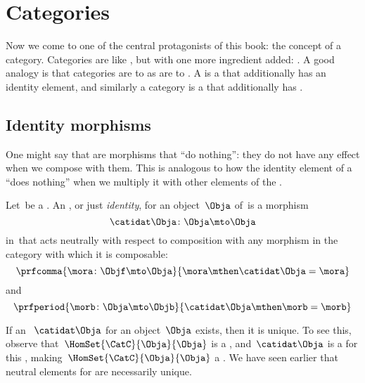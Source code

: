 \section{Categories}

Now we come to one of the central protagonists of this book: the concept of a category.
Categories are like , but with one more ingredient added: .
A good analogy is that categories are to  as  are to .
A  is a  that additionally has an identity element, and similarly a category is a  that additionally has .

\subsection{Identity morphisms}

One might say that   are morphisms that ``do nothing'': they do not have any effect when we compose with them.
This is analogous to how the identity element of a  ``does nothing'' when we multiply it with other elements of the .

\begin{ctdefinition}
    \label{def:identity-morphism}
    Let~\CatC be a .
    An , or just \emph{identity}, for an object~$\Obja$ of~\CatC is a morphism
    \begin{equation}
        \catidat\Obja \colon \Obja \mto \Obja
    \end{equation}
    in~\CatC that acts neutrally with respect to composition with any morphism in the category with which it is composable:
    \begin{equation}\label{eq:identities-unitality-1}
        \prfcomma{
            \mora \colon \Objf \mto \Obja
        }{
            \mora \mthen \catidat\Obja = \mora
        }
    \end{equation}
    and
    \begin{equation}\label{eq:identities-unitality-2}
        \prfperiod{
            \morb \colon \Obja \mto \Objb
        }{
            \catidat\Obja \mthen \morb = \morb
        }
    \end{equation}
\end{ctdefinition}

\begin{remark}
    If an ~$\catidat\Obja$ for an object~$\Obja$ exists, then it is unique.
    To see this, observe that~$\HomSet{\CatC}{\Obja}{\Obja}$ is a , and~$\catidat\Obja$ is a  for this , making~$\HomSet{\CatC}{\Obja}{\Obja}$ a .
    We have seen earlier that neutral elements for  are necessarily unique.
\end{remark}

